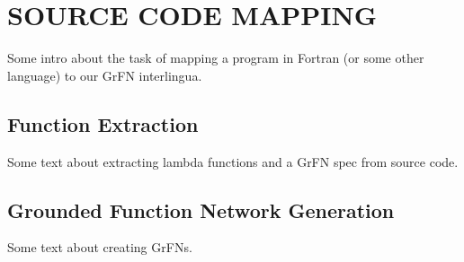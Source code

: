 \chapter{SOURCE CODE MAPPING\label{chapter:mapping}}

Some intro about the task of mapping a program in Fortran (or some other language) to our GrFN interlingua.

\section{Function Extraction\label{sec:func_extract}}

Some text about extracting lambda functions and a GrFN spec from source code.

\section{Grounded Function Network Generation\label{sec:grfn_gen}}

Some text about creating GrFNs.
